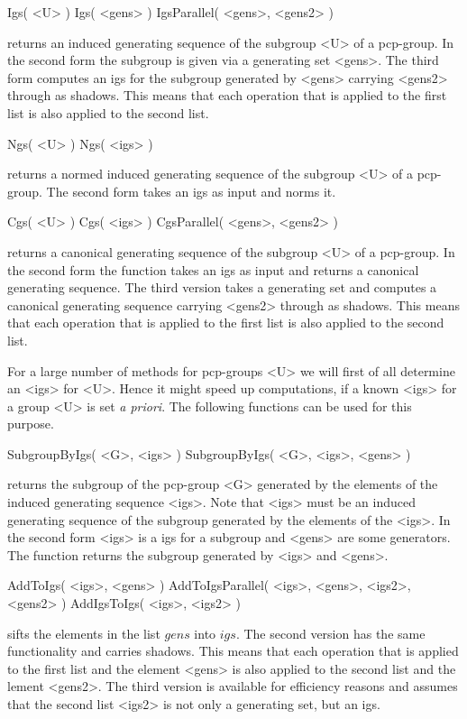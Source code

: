 \>Igs( <U> )
\>Igs( <gens> )
\>IgsParallel( <gens>, <gens2> )

returns an induced generating sequence of the subgroup <U> of a
pcp-group. In the second form the subgroup is given via a generating
set <gens>. The third form computes an igs for the subgroup generated
by <gens> carrying <gens2> through as shadows.  This means that each
operation that is applied to the first list is also applied to the
second list.



\>Ngs( <U> )
\>Ngs( <igs> )

returns a normed induced generating sequence of the subgroup <U> of a
pcp-group. The second form takes an igs as input and norms it.

\>Cgs( <U> )
\>Cgs( <igs> )
\>CgsParallel( <gens>, <gens2> )

returns a canonical generating sequence of the subgroup <U> of a
pcp-group. In the second form the function takes an igs as input and
returns a canonical generating sequence. The third version takes a
generating set and computes a canonical generating sequence carrying
<gens2> through as shadows.  This means that each operation that is
applied to the first list is also applied to the second list.

For a large number of methods for pcp-groups <U> we will first of all 
determine an <igs> for <U>. Hence it might speed up computations, if 
a known <igs> for a group <U> is set {\it a priori}. The following 
functions can be used for this purpose.

\>SubgroupByIgs( <G>, <igs> )
\>SubgroupByIgs( <G>, <igs>, <gens> )

returns the subgroup of the pcp-group <G> generated by the elements of
the induced  generating sequence <igs>.   Note that  <igs> must  be an
induced generating sequence of  the subgroup generated by the elements
of the <igs>. In the second form <igs> is a igs for a subgroup and 
<gens> are some generators. The function returns the subgroup generated
by <igs> and <gens>. 

\> AddToIgs( <igs>, <gens> )
\> AddToIgsParallel( <igs>, <gens>, <igs2>, <gens2> )
\> AddIgsToIgs( <igs>, <igs2> )

sifts the elements in the list $gens$ into $igs$.  The second version
has the same functionality and carries shadows.  This means that each
operation that is applied to the first list and the element <gens> is
also applied to the second list and the lement <gens2>.  The third
version is available for efficiency reasons and assumes that the
second list <igs2> is not only a generating set, but an igs.

